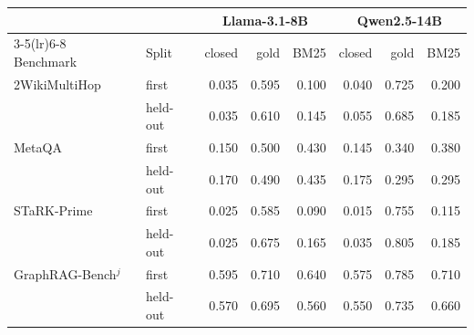 \begin{tabular}{llrrrrrr}
\toprule
 & & \multicolumn{3}{c}{Llama-3.1-8B} & \multicolumn{3}{c}{Qwen2.5-14B}\\
\cmidrule(lr){3-5}\cmidrule(lr){6-8}
Benchmark & Split & closed & gold & BM25 & closed & gold & BM25\\
\midrule
2WikiMultiHop & first & 0.035 & 0.595 & 0.100 & 0.040 & 0.725 & 0.200\\
 & held-out & 0.035 & 0.610 & 0.145 & 0.055 & 0.685 & 0.185\\
MetaQA & first & 0.150 & 0.500 & 0.430 & 0.145 & 0.340 & 0.380\\
 & held-out & 0.170 & 0.490 & 0.435 & 0.175 & 0.295 & 0.295\\
STaRK-Prime & first & 0.025 & 0.585 & 0.090 & 0.015 & 0.755 & 0.115\\
 & held-out & 0.025 & 0.675 & 0.165 & 0.035 & 0.805 & 0.185\\
GraphRAG-Bench$^{j}$ & first & 0.595 & 0.710 & 0.640 & 0.575 & 0.785 & 0.710\\
 & held-out & 0.570 & 0.695 & 0.560 & 0.550 & 0.735 & 0.660\\
\bottomrule
\end{tabular}
